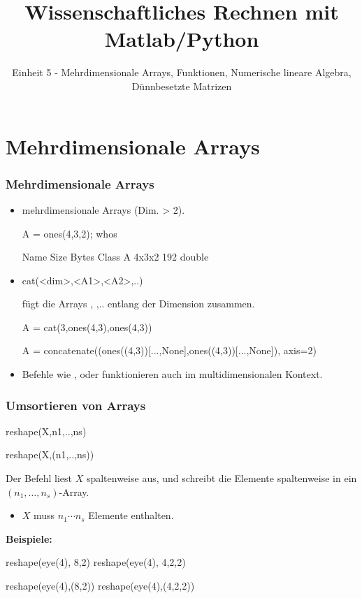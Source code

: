 \documentclass[hyperref={xetex}]{beamer}
\title{Wissenschaftliches Rechnen mit Matlab/Python}
\subtitle{Einheit 5 - Mehrdimensionale Arrays, Funktionen, Numerische lineare Algebra, Dünnbesetzte Matrizen}
\begin{document}
\titlepage

\section{Mehrdimensionale Arrays}
%
%
%
\begin{frame}[fragile]\frametitle{Mehrdimensionale Arrays}
\begin{itemize}
\item mehrdimensionale Arrays (Dim. > 2).
\begin{matlabin}
A = ones(4,3,2);
whos
\end{matlabin}
\begin{matlab}
  Name   Size   Bytes  Class  
  A      4x3x2    192  double  
\end{matlab}
\item 
\begin{matlabin}
cat(<dim>,<A1>,<A2>,..) 
\end{matlabin}
f\"ugt die Arrays , ,.. entlang der Dimension  zusammen. 
\begin{matlabin}
A = cat(3,ones(4,3),ones(4,3))
\end{matlabin}
\begin{pyin}
A = concatenate((ones((4,3))[...,None],ones((4,3))[...,None]), axis=2)
\end{pyin}
\item Befehle wie \alert{ }, \alert{ } oder \alert{
  } funktionieren auch im multidimensionalen Kontext.
\end{itemize}
\end{frame}
%
%
\begin{frame}[fragile]\frametitle{Umsortieren von Arrays}
\begin{matlabin}
reshape(X,n1,..,ns)
\end{matlabin}
\begin{pyin}
reshape(X,(n1,..,ns))  
\end{pyin}
Der Befehl liest $X$ spaltenweise
aus, und schreibt die Elemente spaltenweise in ein $(n_1, \dots,
n_s)$-Array. 
\begin{itemize}
\item $X$ muss $n_1 \cdots n_s$ Elemente enthalten.
\end{itemize}
\textbf{Beispiele:}
\begin{matlabin}
reshape(eye(4), 8,2)
reshape(eye(4), 4,2,2)
\end{matlabin}
\begin{pyin}
reshape(eye(4),(8,2))
reshape(eye(4),(4,2,2))
\end{pyin}
\end{frame}
\end{document}
